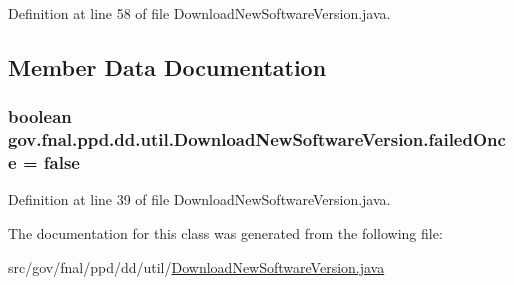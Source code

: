 Definition at line 58 of file Download\-New\-Software\-Version.\-java.



\subsection{Member Data Documentation}
\hypertarget{classgov_1_1fnal_1_1ppd_1_1dd_1_1util_1_1DownloadNewSoftwareVersion_ab4dfef8f6d3204b58e58d82e514324b0}{
\subsubsection[{failed\-Once}]{\setlength{\rightskip}{0pt plus 5cm}boolean gov.\-fnal.\-ppd.\-dd.\-util.\-Download\-New\-Software\-Version.\-failed\-Once = false\hspace{0.3cm}{\ttfamily [static]}}}\label{classgov_1_1fnal_1_1ppd_1_1dd_1_1util_1_1DownloadNewSoftwareVersion_ab4dfef8f6d3204b58e58d82e514324b0}


Definition at line 39 of file Download\-New\-Software\-Version.\-java.



The documentation for this class was generated from the following file\-:\begin{DoxyCompactItemize}
\item 
src/gov/fnal/ppd/dd/util/\hyperlink{DownloadNewSoftwareVersion_8java}{Download\-New\-Software\-Version.\-java}\end{DoxyCompactItemize}
